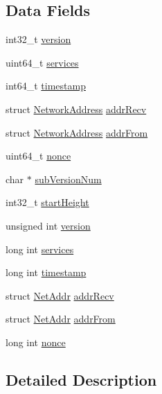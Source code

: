 \subsection*{Data Fields}
\begin{DoxyCompactItemize}
\item 
int32\_\-t \hyperlink{struct_cmd_version_a67fae7dd1de9edce3656ed214d20377f}{version}
\item 
uint64\_\-t \hyperlink{struct_cmd_version_a8361260b2ca75771b8da0333191db456}{services}
\item 
int64\_\-t \hyperlink{struct_cmd_version_a8a591d341723df9496cda98e225b25b4}{timestamp}
\item 
struct \hyperlink{struct_network_address}{NetworkAddress} \hyperlink{struct_cmd_version_a1c343f8763f536140c776a99d43ecde3}{addrRecv}
\item 
struct \hyperlink{struct_network_address}{NetworkAddress} \hyperlink{struct_cmd_version_a459e4f223be92dc8d26e577d85ba4334}{addrFrom}
\item 
uint64\_\-t \hyperlink{struct_cmd_version_af602af589d5bc1af695356386bcb32a9}{nonce}
\item 
char $\ast$ \hyperlink{struct_cmd_version_abe98c3c041a6acda8de5e4052aff3ccd}{subVersionNum}
\item 
int32\_\-t \hyperlink{struct_cmd_version_a75434fa1cfbff59d821bd10ba0cb6df1}{startHeight}
\item 
unsigned int \hyperlink{struct_cmd_version_a5408ac5df4c170828874e1b10b4c35a0}{version}
\item 
long int \hyperlink{struct_cmd_version_a7c2c2697560cb0d08fdca3bd4d10d07e}{services}
\item 
long int \hyperlink{struct_cmd_version_ac402a8520447a72d85baad30fb7d66af}{timestamp}
\item 
struct \hyperlink{struct_net_addr}{NetAddr} \hyperlink{struct_cmd_version_a252b04dc9767f81b38eccddcd72e74ff}{addrRecv}
\item 
struct \hyperlink{struct_net_addr}{NetAddr} \hyperlink{struct_cmd_version_acbbb94e30bbe4e7c99be8e4c61f1e79c}{addrFrom}
\item 
long int \hyperlink{struct_cmd_version_ab0c4e6e9b4c0db0818ba6121afe137a9}{nonce}
\end{DoxyCompactItemize}


\subsection{Detailed Description}


